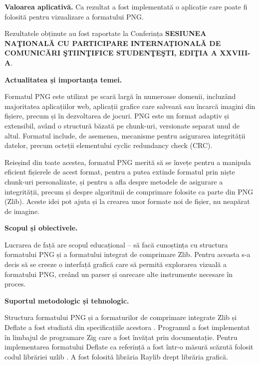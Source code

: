\documentclass[a4paper,12pt]{report}
\newcommand{\conferencesList}{SESIUNEA NAŢIONALĂ CU PARTICIPARE INTERNAȚIONALĂ DE COMUNICĂRI ŞTIINŢIFICE STUDENŢEŞTI, EDIŢIA A XXVIII-A}
\begin{document}
\textbf{Valoarea aplicativă.} Ca rezultat a fost implementată o aplicație care poate fi folosită pentru vizualizare a formatului \ac{PNG}.

Rezultatele obținute au fost raportate la Conferința \textbf{\conferencesList}.



\textbf{Actualitatea și importanța temei.}

Formatul \ac{PNG} este utilizat pe scară largă în numeroase domenii, incluzând majoritatea aplicațiilor
web, aplicații grafice care salvează sau încarcă imagini din fișiere, precum și în dezvoltarea de jocuri.
\ac{PNG} este un format adaptiv și extensibil, având o structură băzată pe chunk-uri, versionate separat unul
de altul. Formatul include, de asemenea, mecanisme pentru asigurarea integrității datelor, precum
octeții elementului cyclic redundancy check (CRC).

Reieșind din toate acestea, formatul \ac{PNG} merită să se învețe pentru a manipula eficient fișierele de
acest format, pentru a putea extinde formatul prin niște chunk-uri personalizate, și pentru a afla despre
metodele de asigurare a integrității, precum și despre algoritmii de comprimare folosite ca parte din \ac{PNG}
(Zlib). Aceste idei pot ajuta și la crearea unor formate noi de fișier, nu neapărat de imagine.

\textbf{Scopul și obiectivele.}

Lucrarea de față are scopul educațional -- să facă cunoștința cu structura formatului \ac{PNG} și a
formatului integrat de comprimare \ac{Zlib}. Pentru aceasta s-a decis să se creeze o interfață grafică care
să permită explorarea vizuală a formatului \ac{PNG}, creând un parser și oarecare alte instrumente necesare în proces.


\textbf{Suportul metodologic și tehnologic.}

Structura formatului \ac{PNG} și a formaturilor de comprimare integrate \ac{Zlib} și Deflate
a fost studiată din specificațiile acestora \cite{png_spec} \cite{zlib_spec} \cite{deflate_spec}.
Programul a fost implementat în limbajul de programare Zig \cite{zig} care a fost învățat prin documentație.
Pentru implementarea formatului Deflate ca referință a fost într-o măsură scăzută folosit codul librăriei uzlib \cite{gzip_impl}.
A fost folosită librăria Raylib \cite{raylib} drept librăria grafică.
\end{document}
